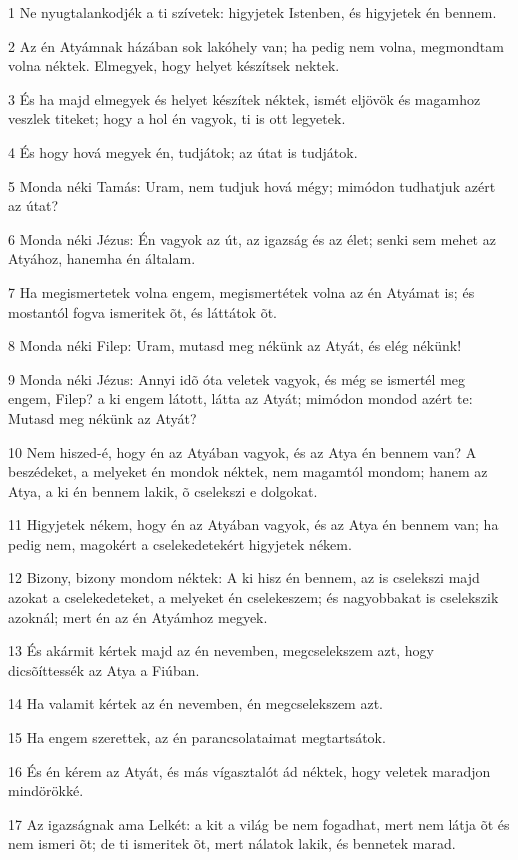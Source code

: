 \par 1 Ne nyugtalankodjék a ti szívetek: higyjetek Istenben, és higyjetek én bennem.
\par 2 Az én Atyámnak házában sok lakóhely van; ha pedig nem volna, megmondtam volna néktek. Elmegyek, hogy helyet készítsek nektek.
\par 3 És ha majd elmegyek és helyet készítek néktek, ismét eljövök és magamhoz veszlek titeket; hogy a hol én vagyok, ti is ott legyetek.
\par 4 És hogy hová megyek én, tudjátok; az útat is tudjátok.
\par 5 Monda néki Tamás: Uram, nem tudjuk hová mégy; mimódon tudhatjuk azért az útat?
\par 6 Monda néki Jézus: Én vagyok az út, az igazság és az élet; senki sem mehet az Atyához, hanemha én általam.
\par 7 Ha megismertetek volna engem, megismertétek volna az én Atyámat is; és mostantól fogva ismeritek õt, és láttátok õt.
\par 8 Monda néki Filep: Uram, mutasd meg nékünk az Atyát, és elég nékünk!
\par 9 Monda néki Jézus: Annyi idõ óta veletek vagyok, és még se ismertél meg engem, Filep? a ki engem látott, látta az Atyát; mimódon mondod azért te: Mutasd meg nékünk az Atyát?
\par 10 Nem hiszed-é, hogy én az Atyában vagyok, és az Atya én bennem van? A beszédeket, a melyeket én mondok néktek, nem magamtól mondom;  hanem az Atya, a ki én bennem lakik, õ cselekszi e dolgokat.
\par 11 Higyjetek nékem, hogy én az Atyában vagyok, és az Atya én bennem van; ha pedig nem, magokért a cselekedetekért higyjetek nékem.
\par 12 Bizony, bizony mondom néktek: A ki hisz én bennem, az is cselekszi majd azokat a cselekedeteket, a melyeket én cselekeszem; és nagyobbakat is cselekszik azoknál; mert én az én Atyámhoz megyek.
\par 13 És akármit kértek majd az én nevemben, megcselekszem azt, hogy dicsõíttessék az Atya a Fiúban.
\par 14 Ha valamit kértek az én nevemben, én megcselekszem azt.
\par 15 Ha engem szerettek, az én parancsolataimat megtartsátok.
\par 16 És én kérem az Atyát, és más vígasztalót ád néktek, hogy veletek maradjon mindörökké.
\par 17 Az igazságnak ama Lelkét: a kit a világ be nem fogadhat, mert nem látja õt és nem ismeri õt; de ti ismeritek õt, mert nálatok lakik, és bennetek marad.

